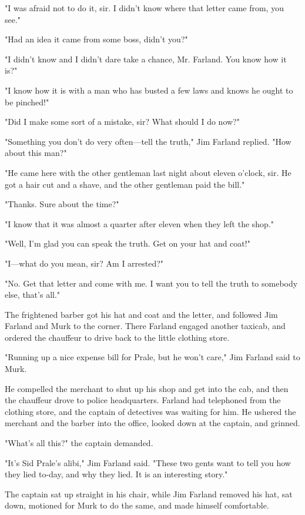 \documentclass{novel}
\begin{document}
"I was afraid not to do it, sir. I didn't know where that letter came from, you see."

"Had an idea it came from some boss, didn't you?"

"I didn't know and I didn't dare take a chance, Mr. Farland. You know how it is?"

"I know how it is with a man who has busted a few laws and knows he ought to be pinched!"

"Did I make some sort of a mistake, sir? What should I do now?"

"Something you don't do very often---tell the truth," Jim Farland replied. "How about this man?"

"He came here with the other gentleman last night about eleven o'clock, sir. He got a hair cut and a shave, and the other gentleman paid the bill."

"Thanks. Sure about the time?"

"I know that it was almost a quarter after eleven when they left the shop."

"Well, I'm glad you can speak the truth. Get on your hat and coat!"

"I---what do you mean, sir? Am I arrested?"

"No. Get that letter and come with me. I want you to tell the truth to somebody else, that's all."

The frightened barber got his hat and coat and the letter, and followed Jim Farland and Murk to the corner. There Farland engaged another taxicab, and ordered the chauffeur to drive back to the little clothing store.

"Running up a nice expense bill for Prale, but he won't care," Jim Farland said to Murk.

He compelled the merchant to shut up his shop and get into the cab, and then the chauffeur drove to police headquarters. Farland had telephoned from the clothing store, and the captain of detectives was waiting for him. He ushered the merchant and the barber into the office, looked down at the captain, and grinned.

"What's all this?" the captain demanded.

"It's Sid Prale's alibi," Jim Farland said. "These two gents want to tell you how they lied to-day, and why they lied. It is an interesting story."

The captain sat up straight in his chair, while Jim Farland removed his hat, sat down, motioned for Murk to do the same, and made himself comfortable.
\end{document}

